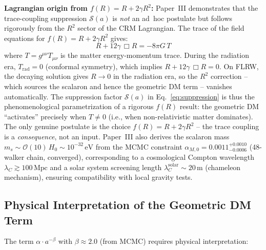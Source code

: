 \documentclass[aps,prd,twocolumn,superscriptaddress,nofootinbib]{revtex4-2}
\begin{document}
\textbf{Lagrangian origin from $f(R) = R + 2\gamma R^2$:} Paper~III \cite{Geiger2026c} demonstrates that the trace-coupling suppression $\mathcal{S}(a)$ is \textit{not} an ad~hoc postulate but follows rigorously from the $R^2$ sector of the CRM Lagrangian. The trace of the field equations for $f(R) = R + 2\gamma R^2$ gives:
\begin{equation}
R + 12\gamma\,\Box R = -8\pi G\,T
\label{eq:trace_fR}
\end{equation}
where $T = g^{\mu\nu}T_{\mu\nu}$ is the matter energy-momentum trace. During the radiation era, $T_{\mathrm{rad}} = 0$ (conformal symmetry), which implies $R + 12\gamma\,\Box R = 0$. On FLRW, the decaying solution gives $R \to 0$ in the radiation era, so the $R^2$ correction -- which sources the scalaron and hence the geometric DM term -- vanishes automatically. The suppression factor $\mathcal{S}(a)$ in Eq.~\eqref{eq:suppression} is thus the phenomenological parametrization of a rigorous $f(R)$ result: the geometric DM ``activates'' precisely when $T \neq 0$ (i.e., when non-relativistic matter dominates). The only genuine postulate is the choice $f(R) = R + 2\gamma R^2$ -- the trace coupling is a \textit{consequence}, not an input. Paper~III also derives the scalaron mass $m_s \sim \mathcal{O}(10)\,H_0 \sim 10^{-32}\,\mathrm{eV}$ from the MCMC constraint $\alpha_{M,0} = 0.0011^{+0.0010}_{-0.0006}$ (48-walker chain, converged), corresponding to a cosmological Compton wavelength $\lambda_C \gtrsim 100\,\mathrm{Mpc}$ and a solar system screening length $\lambda_C^{\mathrm{solar}} \sim 20\,\mathrm{m}$ (chameleon mechanism), ensuring compatibility with local gravity tests.

\subsection{Physical Interpretation of the Geometric DM Term}

The term $\alpha \cdot a^{-\beta}$ with $\beta \approx 2.0$ (from MCMC) requires physical interpretation:
\end{document}
